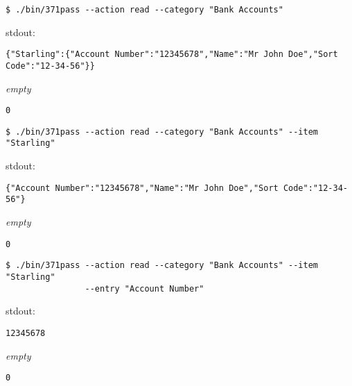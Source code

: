 \documentclass[a4paper]{article}
\begin{document}
\begin{Verbatim}[formatcom=\bfseries]
$ ./bin/371pass --action read --category "Bank Accounts"
\end{Verbatim}
\begin{labeling}{ stdout:}
    \item[stdout:]
    \begin{lstlisting}[backgroundcolor = \color{lightgray},belowskip=0pt]
{"Starling":{"Account Number":"12345678","Name":"Mr John Doe","Sort Code":"12-34-56"}}
    \end{lstlisting}
    
    \item[stderr:]
    \emph{empty}
    
    \item[exit:]
    \texttt{0}
\end{labeling}

\begin{Verbatim}[formatcom=\bfseries]
$ ./bin/371pass --action read --category "Bank Accounts" --item "Starling"   
\end{Verbatim}
\begin{labeling}{ stdout:}
    \item[stdout:]
    \begin{lstlisting}[backgroundcolor = \color{lightgray},belowskip=0pt]
{"Account Number":"12345678","Name":"Mr John Doe","Sort Code":"12-34-56"}
    \end{lstlisting}
    
    \item[stderr:]
    \emph{empty}
    
    \item[exit:]
    \texttt{0}
\end{labeling}

\begin{Verbatim}[formatcom=\bfseries]
$ ./bin/371pass --action read --category "Bank Accounts" --item "Starling"
                --entry "Account Number"
\end{Verbatim}
\begin{labeling}{ stdout:}
    \item[stdout:]
    \begin{lstlisting}[backgroundcolor = \color{lightgray},belowskip=0pt]
12345678
    \end{lstlisting}
    
    \item[stderr:]
    \emph{empty}
    
    \item[exit:]
    \texttt{0}
\end{labeling}
\end{document}
